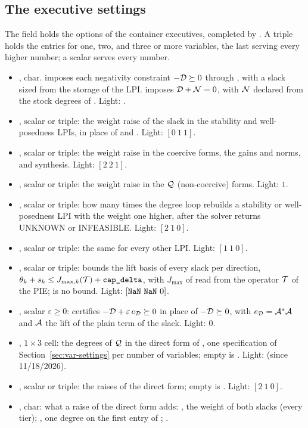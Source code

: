 \subsection{The executive settings}\label{sec:exec-settings}

The field  holds the options of the container executives, completed by . A triple holds the entries for one, two, and three or more variables, the last serving every higher number; a scalar serves every number.
\begin{itemize}\setlength\itemsep{0pt}
\item {}, char.  imposes each negativity constraint $-\mathcal{D}\succeq0$ through , with a slack sized from the storage of the LPI.  imposes $\mathcal{D}+\mathcal{N}=0$, with $\mathcal{N}$ declared from the stock degrees of . Light: .
\item {}, scalar or triple: the weight raise of the slack in the stability and well-posedness LPIs, in place of  and . Light: $[0\ 1\ 1]$.
\item {}, scalar or triple: the weight raise in the coercive forms, the gains and norms, and synthesis. Light: $[2\ 2\ 1]$.
\item {}, scalar or triple: the weight raise in the $\mathcal{Q}$ (non-coercive) forms. Light: $1$.
\item {}, scalar or triple: how many times the degree loop  rebuilds a stability or well-posedness LPI with the weight one higher, after the solver returns UNKNOWN or INFEASIBLE. Light: $[2\ 1\ 0]$.
\item {}, scalar or triple: the same for every other LPI. Light: $[1\ 1\ 0]$.
\item {}, scalar or triple: bounds the lift basis of every slack per direction, $\theta_k+s_k\le J_{\max,k}(\mathcal{T})+\texttt{cap\_delta}$, with $J_{\max}$ of  read from the operator $\mathcal{T}$ of the PIE;  is no bound. Light: $[\code{NaN}\ \code{NaN}\ 0]$.
\item {}, scalar $\varepsilon\ge0$: certifies $-\mathcal{D}+\varepsilon\,e_{\mathcal{D}}\succeq0$ in place of $-\mathcal{D}\succeq0$, with $e_{\mathcal{D}}=\mathcal{A}^*\mathcal{A}$ and $\mathcal{A}$ the lift of the plain term of the slack. Light: $0$.
\item {}, $1\times3$ cell: the degrees of $\mathcal{Q}$ in the direct form  of , one specification of Section~\ref{sec:var-settings} per number of variables; empty is . Light:  (since 11/18/2026).
\item {}, scalar or triple: the raises of the direct form; empty is . Light: $[2\ 1\ 0]$.
\item {}, char: what a raise of the direct form adds: , the weight of both slacks (every tier); , one degree on the first entry of ; .
\end{itemize}
